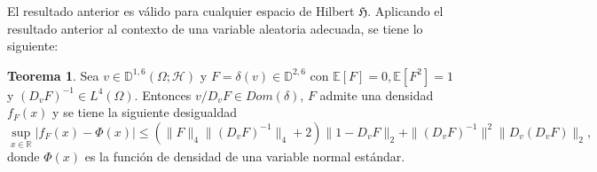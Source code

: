 \documentclass[letterpaper,twoside,12pt]{book}
\newcommand{\R}{\mathbb{R}}
\newcommand{\D}{\mathbb{D}}
\newcommand{\E}{\mathbb{E}}
\newcommand{\1}{\mathds{1}}
\newcommand{\abs}[1]{\left\lvert #1 \right\rvert}
\theoremstyle{definition}
\theoremstyle{definition}
\newtheorem{teo}{Teorema}
\theoremstyle{definition}
\theoremstyle{definition}
\theoremstyle{definition}
\theoremstyle{definition}
\theoremstyle{definition}
\begin{document}
 El resultado anterior es válido para cualquier espacio de Hilbert $\mathfrak{H}$. Aplicando el resultado anterior al contexto de una variable aleatoria adecuada, se tiene lo siguiente:

 \begin{teo} 
  Sea $v\in \D^{1,6}(\Omega;\mathcal{H})$ y $F=\delta(v)\in \D^{2,6}$ con $\E\left[F\right]=0, \E\left[F^{2}\right]=1$ y $\left(D_vF\right)^{-1}\in L^4(\Omega)$. Entonces $v/D_vF \in Dom(\delta)$, $F$ admite una densidad $f_F(x)$ y se tiene la siguiente desigualdad
  \[
    \sup_{x\in \R} \abs{f_F(x)-\Phi(x)}\leq \left(\|F\|_4\|\left(D_vF\right)^{-1}\|_4+2\right)\|1-D_vF\|_2+\|\left(D_vF\right)^{-1}\|^{2}\|D_v \left(D_vF\right)\|_2,
    \]
donde $\Phi(x)$ es la función de densidad de una variable normal estándar.

\end{teo}
\end{document}
